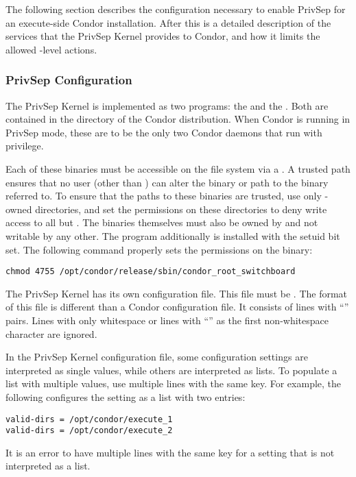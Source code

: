 The following section describes the configuration necessary
to enable PrivSep for an execute-side Condor installation.
After this is a detailed description of
the services that the PrivSep Kernel provides to Condor, and how it
limits the allowed -level actions.

\subsubsection{PrivSep Configuration}

The PrivSep Kernel is implemented as two programs:
the  and the .
Both are contained in
the  directory of the Condor distribution. When Condor is
running in PrivSep mode, these are to be the only two Condor daemons that run
with  privilege.

Each of these binaries must be accessible on the file system via a
. A trusted path ensures that no user (other than
) can alter the binary or path to the binary referred to.
To ensure that the
paths to these binaries are trusted, use only
-owned directories, and set the permissions on
these directories to deny write access to all but . 
The binaries themselves must also be owned by  
and not writable by any other.
The  program additionally
is installed with the setuid bit set. The following command
properly sets the permissions on the 
binary:
\begin{verbatim}
chmod 4755 /opt/condor/release/sbin/condor_root_switchboard
\end{verbatim}

The PrivSep Kernel has its own configuration file.
This file  must be .
The format of this file is different than 
a Condor configuration file.
It consists
of lines with ``'' pairs. 
Lines with only whitespace
or lines with ``\Code{\#}'' as the first non-whitespace character are ignored.

In the PrivSep Kernel configuration file,
some configuration settings are interpreted as single values, 
while others are interpreted as lists. 
To populate a list with multiple values,
use multiple lines with the same key.
For example, the following configures the 
setting as a list with two entries:
\begin{verbatim}
valid-dirs = /opt/condor/execute_1
valid-dirs = /opt/condor/execute_2
\end{verbatim}
It is an error to have multiple lines with the same key for a setting
that is not interpreted as a list.

